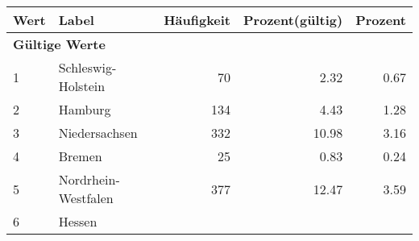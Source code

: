      \begin{longtable}{lXrrr}
     \toprule
     \textbf{Wert} & \textbf{Label} & \textbf{Häufigkeit} & \textbf{Prozent(gültig)} & \textbf{Prozent} \\
     \endhead
     \midrule
     \multicolumn{5}{l}{\textbf{Gültige Werte}}\\

     1 &
     \multicolumn{1}{X}{ Schleswig-Holstein   } &


       \num{70} &
       \num[round-mode=places,round-precision=2]{2,32} &
         \num[round-mode=places,round-precision=2]{0,67} \\

     2 &
     \multicolumn{1}{X}{ Hamburg   } &


       \num{134} &
       \num[round-mode=places,round-precision=2]{4,43} &
         \num[round-mode=places,round-precision=2]{1,28} \\

     3 &
     \multicolumn{1}{X}{ Niedersachsen   } &


       \num{332} &
       \num[round-mode=places,round-precision=2]{10,98} &
         \num[round-mode=places,round-precision=2]{3,16} \\

     4 &
     \multicolumn{1}{X}{ Bremen   } &


       \num{25} &
       \num[round-mode=places,round-precision=2]{0,83} &
         \num[round-mode=places,round-precision=2]{0,24} \\

     5 &
     \multicolumn{1}{X}{ Nordrhein-Westfalen   } &


       \num{377} &
       \num[round-mode=places,round-precision=2]{12,47} &
         \num[round-mode=places,round-precision=2]{3,59} \\

     6 &
     \multicolumn{1}{X}{ Hessen   } &



\end{longtable}
